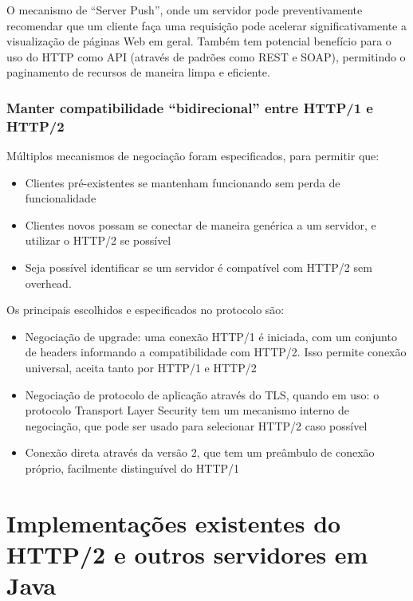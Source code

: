 \documentclass[12pt,a4paper,openright,twoside,]{abntex2}	%
\begin{document}
O mecanismo de ``Server Push'', onde um servidor pode preventivamente
recomendar que um cliente faça uma requisição pode acelerar
significativamente a visualização de páginas Web em geral. Também tem
potencial benefício para o uso do HTTP como API (através de padrões como
REST e SOAP), permitindo o paginamento de recursos de maneira limpa e
eficiente.

\subsubsection{\texorpdfstring{Manter compatibilidade ``bidirecional''
entre HTTP/1 e
HTTP/2}{Manter compatibilidade bidirecional entre HTTP/1 e HTTP/2}}\label{manter-compatibilidade-bidirecional-entre-http1-e-http2}

Múltiplos mecanismos de negociação foram especificados, para permitir
que:

\begin{itemize}
\tightlist
\item
  Clientes pré-existentes se mantenham funcionando sem perda de
  funcionalidade
\item
  Clientes novos possam se conectar de maneira genérica a um servidor, e
  utilizar o HTTP/2 se possível
\item
  Seja possível identificar se um servidor é compatível com HTTP/2 sem
  overhead.
\end{itemize}

Os principais escolhidos e especificados no protocolo são:

\begin{itemize}
\tightlist
\item
  Negociação de upgrade: uma conexão HTTP/1 é iniciada, com um conjunto
  de headers informando a compatibilidade com HTTP/2. Isso permite
  conexão universal, aceita tanto por HTTP/1 e HTTP/2
\item
  Negociação de protocolo de aplicação através do TLS, quando em uso: o
  protocolo Transport Layer Security tem um mecanismo interno de
  negociação, que pode ser usado para selecionar HTTP/2 caso possível
\item
  Conexão direta através da versão 2, que tem um preâmbulo de conexão
  próprio, facilmente distinguível do HTTP/1
\end{itemize}

\section{Implementações existentes do HTTP/2 e outros servidores em
Java}\label{implementauxe7uxf5es-existentes-do-http2-e-outros-servidores-em-java}
\end{document}
